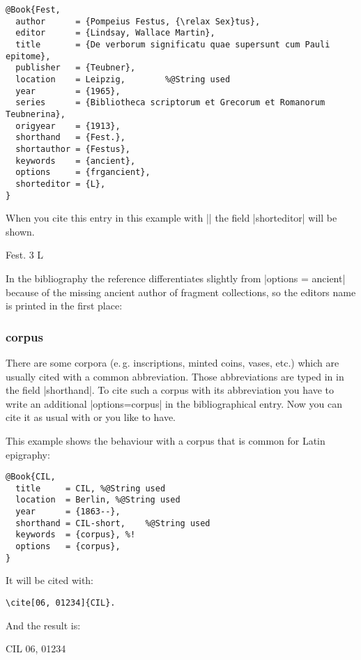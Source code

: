 \documentclass[a4paper,
10pt,
greek,
french,
spanish,
italian,
ngerman,
english
]{ltxdoc}
\begin{document}
\begin{lstlisting}[style=bibentry,label=Fest,caption={{@}Book\{Fest,…\} }]
@Book{Fest,
  author      = {Pompeius Festus, {\relax Sex}tus},
  editor      = {Lindsay, Wallace Martin},
  title       = {De verborum significatu quae supersunt cum Pauli epitome},
  publisher   = {Teubner},
  location    = Leipzig, 		%@String used
  year        = {1965},
  series      = {Bibliotheca scriptorum et Grecorum et Romanorum Teubnerina},
  origyear    = {1913},
  shorthand   = {Fest.},
  shortauthor = {Festus},
  keywords    = {ancient},
  options     = {frgancient},
  shorteditor = {L},
}
\end{lstlisting}

When you cite this entry in this example with |\cite[3]{Fest}| the field  |shorteditor| will be shown.
\begin{bsp}
Fest. 3 L
\end{bsp}

In the bibliography the reference differentiates slightly from |options = {ancient}| because of the missing ancient author of fragment collections, 
so the editors name is printed in the first place:

\subsubsection{corpus}\label{corpus}
There are some corpora (e.\,g. inscriptions, minted coins, vases, etc.) which are usually cited with a common abbreviation. 
Those abbreviations are typed in in the field |shorthand|.
To cite such a corpus with its abbreviation you have to write an additional |options={corpus}| in the bibliographical entry.
Now you can cite it as usual with  or  you like to have.

This example shows the behaviour with a corpus that is common for Latin epigraphy:
\begin{lstlisting}[style=bibentry,label=CIL,caption={{@}Book\{CIL,…\} }]
@Book{CIL,
  title     = CIL, %@String used
  location  = Berlin, %@String used
  year      = {1863--},
  shorthand = CIL-short,	%@String used
  keywords  = {corpus}, %!
  options   = {corpus},
}
\end{lstlisting}

It will be cited with:
\begin{lstlisting}
\cite[06, 01234]{CIL}.
\end{lstlisting}

And the result is:
\begin{bsp}
CIL 06, 01234
\end{bsp}
\end{document}
